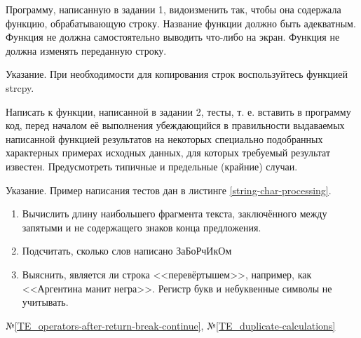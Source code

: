 \labtask

Программу, написанную в задании 1, видоизменить так, чтобы она содержала функцию, обрабатывающую строку.
Название функции должно быть адекватным.
Функция не должна самостоятельно выводить что-либо на экран.
Функция не должна изменять переданную строку.

Указание. При необходимости для копирования строк воспользуйтесь функцией strcpy.

\labtask

Написать к функции, написанной в задании 2, тесты,
т. е. вставить в программу код, перед началом её выполнения убеждающийся в правильности выдаваемых написанной функцией результатов
на некоторых специально подобранных характерных примерах исходных данных,
для которых требуемый результат известен.
Предусмотреть типичные и предельные (крайние) случаи.

Указание. Пример написания тестов дан в листинге \ref{string-char-processing}.

\reservedtasks

\begin{enumerate}
	\item
		Вычислить длину наибольшего фрагмента текста, заключённого между запятыми и не содержащего знаков конца предложения.
	\item
		Подсчитать, сколько слов написано ЗаБоРчИкОм
	\item
		Выяснить, является ли строка <<перевёртышем>>, например, как <<Аргентина манит негра>>.
		Регистр букв и небуквенные символы не учитывать.
\end{enumerate}

\typerrors
№\ref{TE_operators-after-return-break-continue},
№\ref{TE_duplicate-calculations}

